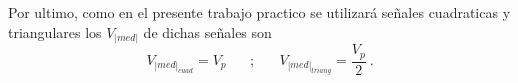             \noindent Por ultimo, como en el presente trabajo practico se 
            utilizará señales cuadraticas y triangulares los \(V_{|med|}\)
            de dichas señales son
            \begin{equation*}
                V_{|med|_{cuad}} = V_p \hspace{20pt};\hspace{20pt} 
                V_{|med|_{triang}} = \dfrac{V_p}{2}~.
            \end{equation*}
